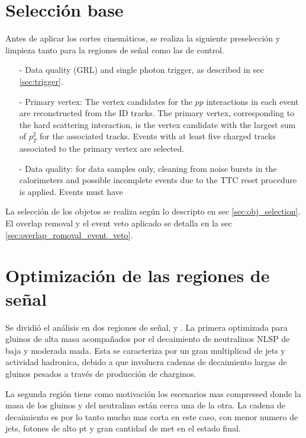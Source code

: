 \section{Selecci\'on base}\label{sec:base_seleccion}

Antes de aplicar los cortes cinemáticos, se realiza la siguiente
preselección y limpieza tanto para la regiones de señal como las de control.

\begin{itemize}\itemsep0.1cm
\item[-] Data quality (GRL) and single photon trigger, as described in sec \ref{sec:trigger}.
\item[-] Primary vertex:
The vertex candidates for the $pp$ interactions in each event are reconstructed from the ID tracks. The
primary vertex, corresponding to the hard scattering interaction, is the vertex candidate with the largest
sum of $p_{T}^{2}$ for the associated tracks. Events with at least five charged tracks associated to the primary
vertex are selected.
\item[-] Data quality: for data samples only, cleaning from noise bursts in the calorimeters and possible incomplete events due to the TTC reset procedure is applied. Events must
have %
\end{itemize}

La selección de los objetos se realiza según lo descripto en sec \ref{sec:obj_selection}.
El overlap removal y el event veto aplicado se detalla en la sec \ref{sec:overlap_romoval_event_veto}.

\section{Optimizaci\'on de las regiones de se\~nal}

Se dividió el análisis en dos regiones de señal, {\SRL} y {\SRH}.
La primera optimizada para gluinos de alta masa acompañados por el decaimiento de
neutralinos NLSP de baja y moderada mada. Esta se caracteriza por un gran multiplicad
de jets y actividad hadronica, debido a que involucra cadenas de decaimiento largas de gluinos
pesados a través de producción de charginos.

La segunda región tiene como motivación los escenarios mas compressed donde la masa de los gluinos
y del neutralino están cerca una de la otra. La cadena de decaimiento es por lo tanto mucho mas corta
en este caso, con menor numero de jets, fotones de alto pt y gran cantidad de met en el estado final.

